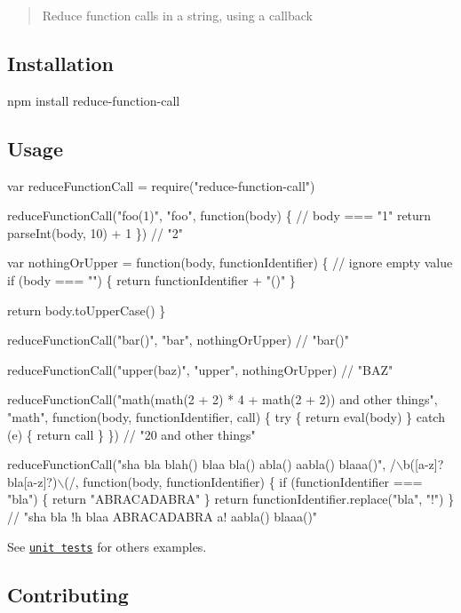 \begin{quote}
Reduce function calls in a string, using a callback \end{quote}


\subsection*{Installation}


\begin{DoxyCode}
npm install reduce-function-call
\end{DoxyCode}


\subsection*{Usage}


\begin{DoxyCode}
var reduceFunctionCall = require("reduce-function-call")

reduceFunctionCall("foo(1)", "foo", function(body) \{
  // body === "1"
  return parseInt(body, 10) + 1
\})
// "2"

var nothingOrUpper = function(body, functionIdentifier) \{
  // ignore empty value
  if (body === "") \{
    return functionIdentifier + "()"
  \}

  return body.toUpperCase()
\}

reduceFunctionCall("bar()", "bar", nothingOrUpper)
// "bar()"

reduceFunctionCall("upper(baz)", "upper", nothingOrUpper)
// "BAZ"

reduceFunctionCall("math(math(2 + 2) * 4 + math(2 + 2)) and other things", "math", function(body,
       functionIdentifier, call) \{
  try \{
    return eval(body)
  \}
  catch (e) \{
    return call
  \}
\})
// "20 and other things"

reduceFunctionCall("sha bla blah() blaa bla() abla() aabla() blaaa()", /\(\backslash\)b([a-z]?bla[a-z]?)\(\backslash\)(/,
       function(body, functionIdentifier) \{
  if (functionIdentifier === "bla") \{
    return "ABRACADABRA"
  \}
  return functionIdentifier.replace("bla", "!")
\}
// "sha bla !h blaa ABRACADABRA a! aabla() blaaa()"
\end{DoxyCode}


See \href{test/index.js}{\tt unit tests} for others examples.

\subsection*{Contributing}

